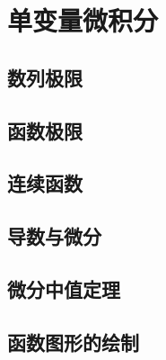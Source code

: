 \part{单变量微积分}

\chapter{数列极限}








\chapter{函数极限}









\chapter{连续函数}





% 
% 

\chapter{导数与微分}\label{chapter:导数}







\chapter{微分中值定理}






\chapter{函数图形的绘制}






